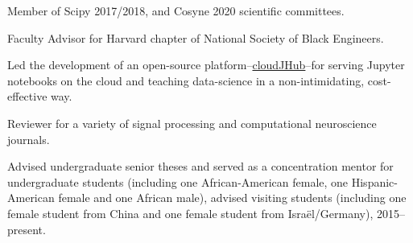 \documentclass[12pt]{article}
\renewenvironment{itemize}{
  \begin{list}{}{
    \setlength{\itemsep}{0.25em}
    \setlength{\parskip}{0pt}
    \setlength{\parsep}{0.25em}
  }
}{
  \end{list}
}
\begin{document}
\begin{itemize}
  \item[\textbullet] Member of Scipy 2017/2018, and Cosyne 2020 scientific committees.
  \item[\textbullet] Faculty Advisor for Harvard chapter of National Society of Black Engineers.
  \item[\textbullet] Led the development of an open-source platform--\href{https://github.com/harvard/cloudJHub}{cloudJHub}--for serving Jupyter notebooks on the cloud and teaching data-science in a non-intimidating, cost-effective way.
  \item[\textbullet] Reviewer for a variety of signal processing and computational neuroscience journals.
  \item[\textbullet] Advised undergraduate senior theses and served as a concentration mentor for undergraduate students (including one African-American female, one Hispanic-American female and one African male), advised visiting students (including one female student from China and one female student from Isra\"{e}l/Germany), 2015--present.
\end{itemize}




\end{document}
